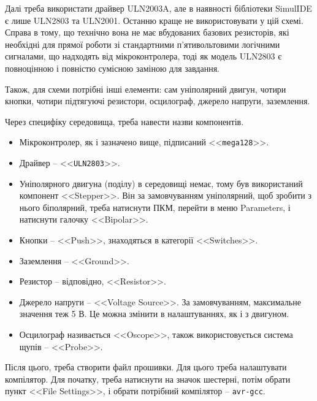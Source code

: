 \documentclass[14pt, a4paper]{extreport}
\begin{document}
	
	Далі треба використати драйвер ULN2003A, але в наявності бібліотеки SimulIDE є лише ULN2803 та ULN2001. Останню краще не використовувати у цій схемі. Справа в тому, що технічно вона не має вбудованих базових резисторів, які необхідні для прямої роботи зі стандартними п'ятивольтовими логічними сигналами, що надходять від мікроконтролера, тоді як модель ULN2803 є повноцінною і повністю сумісною заміною для завдання.
	
	Також, для схеми потрібні інші елементи: сам уніполярний двигун, чотири кнопки, чотири підтягуючі резистори, осцилограф, джерело напруги, заземлення.
	
	Через специфіку середовища, треба навести назви компонентів.
	
	\begin{itemize}
		\item Мікроконтролер, як і зазначено вище, підписаний <<\texttt{mega128}>>.
		
		\item Драйвер -- <<\texttt{ULN2803}>>.
		
		\item Уніполярного двигуна (поділу) в середовищі немає, тому був використаний компонент <<Stepper>>. Він за замовчуванням уніполярний, щоб зробити з нього біполярний, треба натиснути ПКМ, перейти в меню Parameters, і натиснути галочку <<Bipolar>>.
		
		\item Кнопки -- <<Push>>, знаходяться в категорії <<Switches>>.
		
		\item Заземлення -- <<Ground>>.
		
		\item Резистор -- відповідно, <<Resistor>>.
		
		\item Джерело напруги -- <<Voltage Source>>. За замовчуванням, максимальне значення теж 5 В. Це можна змінити в налаштуваннях, як і з двигуном.
		
		\item Осцилограф називається <<Oscope>>, також використовується система щупів -- <<Probe>>.
	\end{itemize}
	
	
	Після цього, треба створити файл прошивки. Для цього треба налаштувати компілятор. Для початку, треба натиснути на значок шестерні, потім обрати пункт <<File Settings>>, і обрати потрібний компілятор -- \texttt{avr-gcc}.
	
\end{document}
